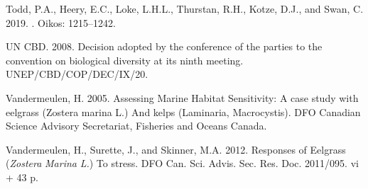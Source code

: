 \documentclass[12pt]{article}\usepackage[]{graphicx}\usepackage[]{color}
\begin{document}
\begin{CSLReferences}{1}{0}
%
Todd, P.A., Heery, E.C., Loke, L.H.L., Thurstan, R.H., Kotze, D.J., and Swan, C. 2019. . Oikos: 1215--1242.

%
UN CBD. 2008. Decision adopted by the conference of the parties to the convention on biological diversity at its ninth meeting. UNEP/CBD/COP/DEC/IX/20.

%
Vandermeulen, H. 2005. Assessing {Marine Habitat Sensitivity}: {A} case study with eelgrass ({Zostera} marina {L}.) And kelps ({Laminaria}, {Macrocystis}). {DFO Canadian Science Advisory Secretariat, Fisheries and Oceans Canada}.

%
Vandermeulen, H., Surette, J., and Skinner, M.A. 2012. Responses of {Eelgrass} ({\emph{Zostera}}{ \emph{Marina} }{\emph{L}}{\emph{.}}) To stress. DFO Can. Sci. Advis. Sec. Res. Doc. 2011/095. vi + 43 p.

\end{CSLReferences}
\end{document}

